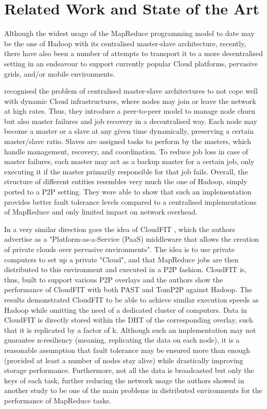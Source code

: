 \chapter{Related Work and State of the Art}
Although the widest usage of the MapReduce programming model to date may be the one of Hadoop \cite{Hadoop} with its centralised master-slave architecture, recently, there have also been a number of attempts to transport it to a more decentralised setting in an endeavour to support currently popular Cloud platforms, pervasive grids, and/or mobile environments. 

\cite{Marozzo2012a} recognised the problem of centralised master-slave architectures to not cope well with dynamic Cloud infrastructures, where nodes may join or leave the network at high rates. Thus, they introduce a peer-to-peer model to manage node churn but also master failures and job recovery in a decentralised way. Each node may become a master or a slave at any given time dynamically, preserving a certain master/slave ratio. Slaves are assigned tasks to perform by the masters, which handle management, recovery, and coordination. To reduce job loss in case of master failures, each master may act as a backup master for a certain job, only executing it if the master primarily responsible for that job fails. Overall, the structure of different entities resembles very much the one of Hadoop, simply ported to a P2P setting. They were able to show that such an implementation provides better fault tolerance levels compared to a centralised implementations of MapReduce and only limited impact on network overhead. 

In a very similar direction goes the idea of CloudFIT \cite{Steffenel2015}, which the authors advertise as a "Platform-as-a-Service (PaaS) middleware that allows the creation of private clouds over pervasive environments". The idea is to use private computers to set up a private "Cloud", and that MapReduce jobs are then distributed to this environment and executed in a P2P fashion. CloudFIT is, thus, built to support various P2P overlays and the authors show the performance of CloudFIT with both PAST and TomP2P against Hadoop. The results demonstrated CloudFIT to be able to achieve similar execution speeds as Hadoop while omitting the need of a dedicated cluster of computers. Data in CloudFIT is directly stored within the DHT of the corresponding overlay, such that it is replicated by a factor of k. Although such an implementation may not guarantee n-resiliency (meaning, replicating the data on each node), it is a reasonable assumption that fault tolerance may be ensured more than enough (provided at least a number of nodes stay alive) while drastically improving storage performance. Furthermore, not all the data is broadcasted but only the keys of each task, further reducing the network usage the authors showed in another study \cite{Steffenel2015a} to be one of the main problems in distributed environments for the performance of MapReduce tasks.

